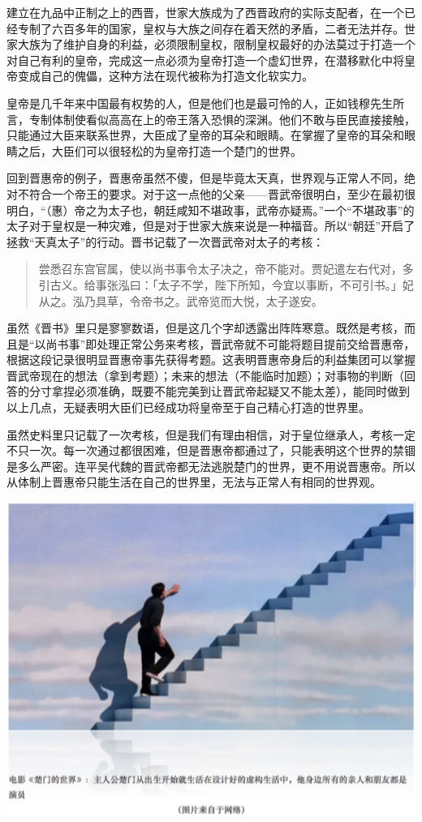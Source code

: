 \documentclass[
]{book}
\begin{document}
建立在九品中正制之上的西晋，世家大族成为了西晋政府的实际支配者，在一个已经专制了六百多年的国家，皇权与大族之间存在着天然的矛盾，二者无法并存。世家大族为了维护自身的利益，必须限制皇权，限制皇权最好的办法莫过于打造一个对自己有利的皇帝，完成这一点必须为皇帝打造一个虚幻世界，在潜移默化中将皇帝变成自己的傀儡，这种方法在现代被称为打造文化软实力。

皇帝是几千年来中国最有权势的人，但是他们也是最可怜的人，正如钱穆先生所言，专制体制使看似高高在上的帝王落入恐惧的深渊。他们不敢与臣民直接接触，只能通过大臣来联系世界，大臣成了皇帝的耳朵和眼睛。在掌握了皇帝的耳朵和眼睛之后，大臣们可以很轻松的为皇帝打造一个楚门的世界。

回到晋惠帝的例子，晋惠帝虽然不傻，但是毕竟太天真，世界观与正常人不同，绝对不符合一个帝王的要求。对于这一点他的父亲------晋武帝很明白，至少在最初很明白，``（惠）帝之为太子也，朝廷咸知不堪政事，武帝亦疑焉。''一个``不堪政事''的太子对于皇权是一种灾难，但是对于世家大族来说是一种福音。所以``朝廷''开启了拯救``天真太子''的行动。晋书记载了一次晋武帝对太子的考核：

\begin{quote}
尝悉召东宫官属，使以尚书事令太子决之，帝不能对。贾妃遣左右代对，多引古义。给事张泓曰：「太子不学，陛下所知，今宜以事断，不可引书。」妃从之。泓乃具草，令帝书之。武帝览而大悦，太子遂安。
\end{quote}

虽然《晋书》里只是寥寥数语，但是这几个字却透露出阵阵寒意。既然是考核，而且是``以尚书事''即处理正常公务来考核，晋武帝就不可能将题目提前交给晋惠帝，根据这段记录很明显晋惠帝事先获得考题。这表明晋惠帝身后的利益集团可以掌握晋武帝现在的想法（拿到考题）；未来的想法（不能临时加题）；对事物的判断（回答的分寸拿捏必须准确，既要不能完美到让晋武帝起疑又不能太差），能同时做到以上几点，无疑表明大臣们已经成功将皇帝至于自己精心打造的世界里。

虽然史料里只记载了一次考核，但是我们有理由相信，对于皇位继承人，考核一定不只一次。每一次通过都很困难，但是晋惠帝都通过了，只能表明这个世界的禁锢是多么严密。连平吴代魏的晋武帝都无法逃脱楚门的世界，更不用说晋惠帝。所以从体制上晋惠帝只能生活在自己的世界里，无法与正常人有相同的世界观。

\includegraphics[width=6.67in]{images/his6}
\end{document}
